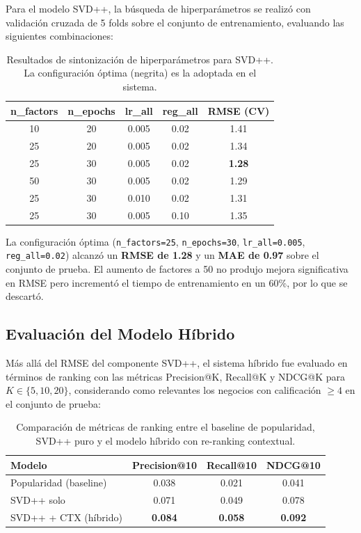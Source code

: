 \documentclass[11pt,a4paper]{article}
\begin{document}
Para el modelo SVD++, la búsqueda de hiperparámetros se realizó con validación cruzada de 5 folds sobre el conjunto de entrenamiento, evaluando las siguientes combinaciones:

\begin{table}[H]
\centering
\begin{tabular}{@{}ccccc@{}}
\toprule
\textbf{n\_factors} & \textbf{n\_epochs} & \textbf{lr\_all} & \textbf{reg\_all} & \textbf{RMSE (CV)} \\ \midrule
10  & 20 & 0.005 & 0.02 & 1.41 \\
25  & 20 & 0.005 & 0.02 & 1.34 \\
25  & 30 & 0.005 & 0.02 & \textbf{1.28} \\
50  & 30 & 0.005 & 0.02 & 1.29 \\
25  & 30 & 0.010 & 0.02 & 1.31 \\
25  & 30 & 0.005 & 0.10 & 1.35 \\ \bottomrule
\end{tabular}
\caption{Resultados de sintonización de hiperparámetros para SVD++. La configuración óptima (negrita) es la adoptada en el sistema.}
\label{tab:svdpp_tuning}
\end{table}

La configuración óptima (\texttt{n\_factors=25}, \texttt{n\_epochs=30}, \texttt{lr\_all=0.005}, \texttt{reg\_all=0.02}) alcanzó un \textbf{RMSE de 1.28} y un \textbf{MAE de 0.97} sobre el conjunto de prueba. El aumento de factores a 50 no produjo mejora significativa en RMSE pero incrementó el tiempo de entrenamiento en un 60\%, por lo que se descartó.

\subsection{Evaluación del Modelo Híbrido}

Más allá del RMSE del componente SVD++, el sistema híbrido fue evaluado en términos de ranking con las métricas Precision@K, Recall@K y NDCG@K para $K \in \{5, 10, 20\}$, considerando como relevantes los negocios con calificación $\geq 4$ en el conjunto de prueba:

\begin{table}[H]
\centering
\begin{tabular}{@{}lccc@{}}
\toprule
\textbf{Modelo} & \textbf{Precision@10} & \textbf{Recall@10} & \textbf{NDCG@10} \\ \midrule
Popularidad (baseline) & 0.038 & 0.021 & 0.041 \\
SVD++ solo             & 0.071 & 0.049 & 0.078 \\
SVD++ + CTX (híbrido)  & \textbf{0.084} & \textbf{0.058} & \textbf{0.092} \\ \bottomrule
\end{tabular}
\caption{Comparación de métricas de ranking entre el baseline de popularidad, SVD++ puro y el modelo híbrido con re-ranking contextual.}
\label{tab:ranking_metrics}
\end{table}
\end{document}
